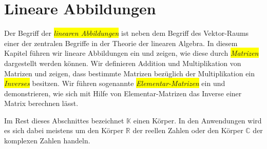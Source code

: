 \chapter{Lineare Abbildungen}
Der Begriff der \colorbox{yellow}{\emph{linearen Abbildungen}} ist neben dem Begriff des Vektor-Raums einer der zentralen Begriffe in der Theorie der
linearen Algebra.  In diesem Kapitel f\"{u}hren wir lineare Abbildungen ein und zeigen, wie diese
durch \colorbox{yellow}{\emph{Matrizen}} dargestellt werden k\"{o}nnen.  Wir definieren Addition und Multiplikation
von Matrizen und zeigen, dass bestimmte Matrizen bez\"{u}glich der Multiplikation ein \colorbox{yellow}{\emph{Inverses}} besitzen.
Wir f\"{u}hren sogenannte \colorbox{yellow}{\emph{Elementar-Matrizen}} ein und demonstrieren, wie sich mit Hilfe von
Elementar-Matrizen das Inverse einer Matrix berechnen l\"{a}sst.  

Im Rest dieses Abschnittes bezeichnet
$\mathbb{K}$ einen K\"{o}rper.  In den Anwendungen wird es sich dabei meistens um den K\"{o}rper
$\mathbb{R}$ der reellen Zahlen oder den K\"{o}rper $\mathbb{C}$ der komplexen Zahlen handeln.

